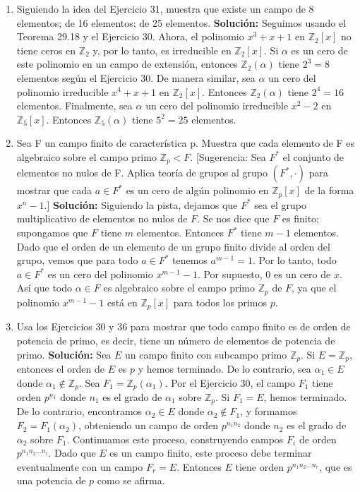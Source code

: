 \begin{enumerate}
    \item  Siguiendo la idea del Ejercicio 31, muestra que existe un campo de 8 elementos; de 16 elementos; de 25 elementos.
    \textbf{Solución:}
    Seguimos usando el Teorema 29.18 y el Ejercicio 30. Ahora, el polinomio \( x^3 + x + 1 \) en \( \mathbb{Z}_2[x] \) no tiene ceros en \( \mathbb{Z}_2 \) y, por lo tanto, es irreducible en \( \mathbb{Z}_2[x] \). Si \( \alpha \) es un cero de este polinomio en un campo de extensión, entonces \( \mathbb{Z}_2(\alpha) \) tiene \( 2^3 = 8 \) elementos según el Ejercicio 30.
    De manera similar, sea \( \alpha \) un cero del polinomio irreducible \( x^4 + x + 1 \) en \( \mathbb{Z}_2[x] \). Entonces \( \mathbb{Z}_2(\alpha) \) tiene \( 2^4 = 16 \) elementos.
    Finalmente, sea \( \alpha \) un cero del polinomio irreducible \( x^2 - 2 \) en \( \mathbb{Z}_5[x] \). Entonces \( \mathbb{Z}_5(\alpha) \) tiene \( 5^2 = 25 \) elementos.
    \item  Sea F un campo finito de característica p. Muestra que cada elemento de F es algebraico sobre el campo primo $\mathbb{Z}_p < F$. [Sugerencia: Sea $F^*$ el conjunto de elementos no nulos de F. Aplica teoría de grupos al grupo $(F^*, \cdot)$ para mostrar que cada $a \in F^*$ es un cero de algún polinomio en $\mathbb{Z}_p[x]$ de la forma $x^n - 1$.]
    \textbf{Solución:}
    Siguiendo la pista, dejamos que \( F^* \) sea el grupo multiplicativo de elementos no nulos de \( F \). Se nos dice que \( F \) es finito; supongamos que \( F \) tiene \( m \) elementos. Entonces \( F^* \) tiene \( m - 1 \) elementos. Dado que el orden de un elemento de un grupo finito divide al orden del grupo, vemos que para todo \( a \in F^* \) tenemos \( a^{m-1} = 1 \). Por lo tanto, todo \( a \in F^* \) es un cero del polinomio \( x^{m-1} - 1 \). Por supuesto, \( 0 \) es un cero de \( x \). Así que todo \( \alpha \in F \) es algebraico sobre el campo primo \( \mathbb{Z}_p \) de \( F \), ya que el polinomio \( x^{m-1} - 1 \) está en \( \mathbb{Z}_p[x] \) para todos los primos \( p \).
    \item Usa los Ejercicios 30 y 36 para mostrar que todo campo finito es de orden de potencia de primo, es decir, tiene un número de elementos de potencia de primo.
    \textbf{Solución:}
    Sea \( E \) un campo finito con subcampo primo \( \mathbb{Z}_p \). Si \( E = \mathbb{Z}_p \), entonces el orden de \( E \) es \( p \) y hemos terminado. De lo contrario, sea \( \alpha_1 \in E \) donde \( \alpha_1 \notin \mathbb{Z}_p \). Sea \( F_1 = \mathbb{Z}_p(\alpha_1) \). Por el Ejercicio 30, el campo \( F_1 \) tiene orden \( p^{n_1} \) donde \( n_1 \) es el grado de \( \alpha_1 \) sobre \( \mathbb{Z}_p \). Si \( F_1 = E \), hemos terminado. De lo contrario, encontramos \( \alpha_2 \in E \) donde \( \alpha_2 \notin F_1 \), y formamos \( F_2 = F_1(\alpha_2) \), obteniendo un campo de orden \( p^{n_1n_2} \) donde \( n_2 \) es el grado de \( \alpha_2 \) sobre \( F_1 \). Continuamos este proceso, construyendo campos \( F_i \) de orden \( p^{n_1n_2 \dots n_i} \). Dado que \( E \) es un campo finito, este proceso debe terminar eventualmente con un campo \( F_r = E \). Entonces \( E \) tiene orden \( p^{n_1n_2 \dots n_r} \), que es una potencia de \( p \) como se afirma.


\end{enumerate}
